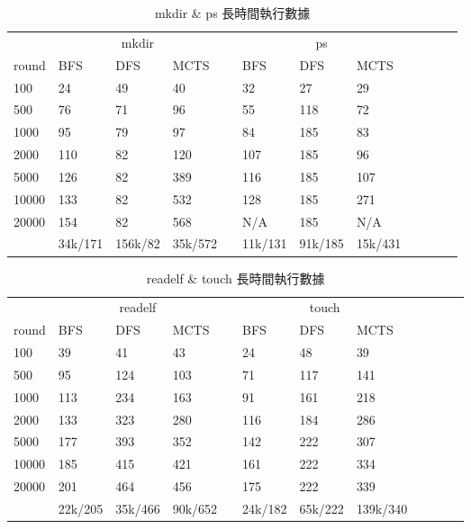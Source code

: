 \documentclass[12pt,a4paper,oneside]{book}
\begin{document}
\begin{appendices}
\begin{table}[htbp]
\centering
\caption{mkdir \& ps 長時間執行數據}
\label{large4}
\begin{tabular}{@{}llllllllllll@{}} \toprule
             & \multicolumn{3}{c}{mkdir} & \phantom{abc} & \multicolumn{3}{c}{ps} \\ \cmidrule{2-4} \cmidrule{6-8}
round      & BFS   & DFS  & MCTS & & BFS   & DFS & MCTS     \\ \midrule
100        & 24    & 49   & 40   & & 32    & 27  & 29       \\
500        & 76    & 71   & 96   & & 55    & 118 & 72       \\
1000       & 95    & 79   & 97   & & 84    & 185 & 83       \\
2000       & 110   & 82   & 120  & & 107   & 185 & 96       \\
5000       & 126   & 82   & 389  & & 116   & 185 & 107      \\
10000      & 133   & 82   & 532  & & 128   & 185 & 271      \\
20000      & 154   & 82   & 568  & & N/A   & 185 & N/A       \\
& 34k/171 & 156k/82 & 35k/572 & & 11k/131 & 91k/185 & 15k/431 \\ \bottomrule
\end{tabular}
\end{table}

\begin{table}[htbp]
\centering
\caption{readelf \& touch 長時間執行數據}
\label{large5}
\begin{tabular}{@{}llllllllllll@{}} \toprule
             & \multicolumn{3}{c}{readelf} & \phantom{abc} & \multicolumn{3}{c}{touch} \\ \cmidrule{2-4} \cmidrule{6-8}
round      & BFS   & DFS  & MCTS & & BFS   & DFS & MCTS     \\ \midrule
100        & 39    & 41   & 43   & & 24    & 48  & 39       \\
500        & 95    & 124  & 103  & & 71    & 117 & 141      \\
1000       & 113   & 234  & 163  & & 91    & 161 & 218      \\
2000       & 133   & 323  & 280  & & 116   & 184 & 286      \\
5000       & 177   & 393  & 352  & & 142   & 222 & 307      \\
10000      & 185   & 415  & 421  & & 161   & 222 & 334      \\
20000      & 201   & 464  & 456  & & 175   & 222 & 339      \\ 
& 22k/205 & 35k/466 & 90k/652  & & 24k/182 & 65k/222 & 139k/340 \\ \bottomrule
\end{tabular}
\end{table}

\end{appendices}
\end{document}
